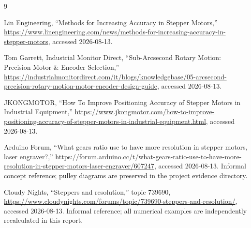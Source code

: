 \documentclass[11pt,a4paper]{article}
\begin{document}
\begin{thebibliography}{9}

Lin Engineering, ``Methods for Increasing Accuracy in Stepper Motors,''
\url{https://www.linengineering.com/news/methods-for-increasing-accuracy-in-stepper-motors}, accessed 2026-08-13.

Tom Garrett, Industrial Monitor Direct, ``Sub-Arcsecond Rotary Motion: Precision Motor \& Encoder Selection,''
\url{https://industrialmonitordirect.com/it/blogs/knowledgebase/05-arcsecond-precision-rotary-motion-motor-encoder-design-guide}, accessed 2026-08-13.

JKONGMOTOR, ``How To Improve Positioning Accuracy of Stepper Motors in Industrial Equipment,''
\url{https://www.jkongmotor.com/how-to-improve-positioning-accuracy-of-stepper-motors-in-industrial-equipment.html}, accessed 2026-08-13.

Arduino Forum, ``What gears ratio use to have more resolution in stepper motors, laser engraver?,''
\url{https://forum.arduino.cc/t/what-gears-ratio-use-to-have-more-resolution-in-stepper-motors-laser-engraver/607247}, accessed 2026-08-13. Informal concept reference; pulley diagrams are preserved in the project evidence directory.

Cloudy Nights, ``Steppers and resolution,'' topic 739690,
\url{https://www.cloudynights.com/forums/topic/739690-steppers-and-resolution/}, accessed 2026-08-13. Informal reference; all numerical examples are independently recalculated in this report.

\end{thebibliography}
\end{document}
